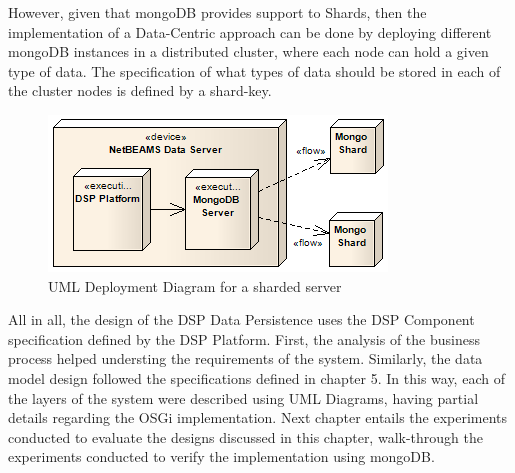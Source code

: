 However, given that mongoDB provides support to Shards, then the implementation
of a Data-Centric approach can be done by deploying different mongoDB instances
in a distributed cluster, where each node can hold a given type of data. The
specification of what types of data should be stored in each of the cluster
nodes is defined by a shard-key.

\begin{figure}[!h]
  \centering
  \includegraphics[scale=0.7]{../diagrams/DSP-Data-Persistence-Deployment-Sharded}
  \caption{UML Deployment Diagram for a sharded server}
  \label{fig:DSP-Data-Persistence-Deployment-Sharded}
\end{figure}

All in all, the design of the DSP Data Persistence uses the DSP Component
specification defined by the DSP Platform. First, the analysis of the business
process helped understing the requirements of the system. Similarly, the data
model design followed the specifications defined in chapter 5. In this way,
each of the layers of the system were described using UML Diagrams, having
partial details regarding the OSGi implementation. Next chapter entails the
experiments conducted to evaluate the designs discussed in this
chapter, walk-through the experiments conducted to verify the implementation
using mongoDB.
